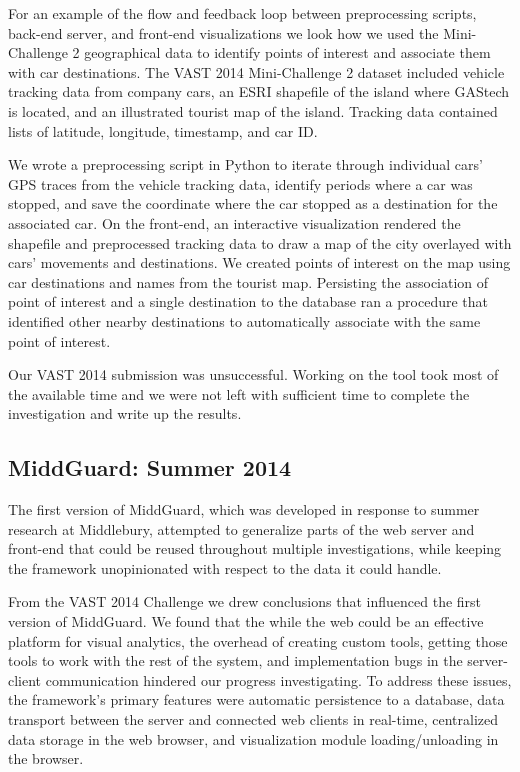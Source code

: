 \documentclass[midd]{thesis}
\begin{document}
For an example of the flow and feedback loop between preprocessing scripts,
back-end server, and front-end visualizations we look how we used the
Mini-Challenge 2 geographical data to identify points of interest and associate
them with car destinations. The VAST 2014 Mini-Challenge 2 dataset included
vehicle tracking data from company cars, an ESRI shapefile of the island where
GAStech is located, and an illustrated tourist map of the island. Tracking data
contained lists of latitude, longitude, timestamp, and car ID.

We wrote a preprocessing script in Python to iterate through individual
cars' GPS traces from the vehicle tracking data, identify periods where a car
was stopped, and save the coordinate where the car stopped as a destination for
the associated car. On the front-end, an interactive visualization rendered the
shapefile and preprocessed tracking data to draw a map of the city overlayed
with cars' movements and destinations. We created points of interest on the map
using car destinations and names from the tourist map. Persisting the
association of point of interest and a single destination to the database ran a
procedure that identified other nearby destinations to automatically associate
with the same point of interest.

Our VAST 2014 submission was unsuccessful. Working on the tool took most of the
available time and we were not left with sufficient time to complete the
investigation and write up the results.

\subsection{MiddGuard: Summer 2014}

The first version of MiddGuard, which was developed in response to summer
research at Middlebury, attempted to generalize parts of the web server and
front-end that could be reused throughout multiple investigations, while keeping
the framework unopinionated with respect to the data it could handle.

From the VAST 2014 Challenge we drew conclusions that influenced the first
version of MiddGuard. We found that the while the web could be an effective
platform for visual analytics, the overhead of creating custom tools, getting
those tools to work with the rest of the system, and implementation bugs in the
server-client communication hindered our progress investigating. To address
these issues, the framework's primary features were automatic persistence to a
database, data transport between the server and connected web clients in
real-time, centralized data storage in the web browser, and visualization module
loading/unloading in the browser.
\end{document}
